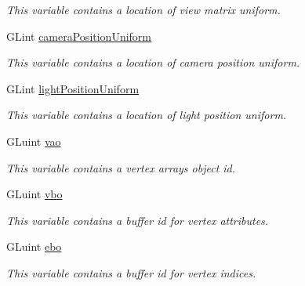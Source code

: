 \begin{DoxyCompactItemize}
\begin{DoxyCompactList}\small\item\em This variable contains a location of view matrix uniform. \end{DoxyCompactList}\item 
\hypertarget{structPhongVariables_a8ef62f404f03093b3e1da8f9d059646c}{G\-Lint \hyperlink{structPhongVariables_a8ef62f404f03093b3e1da8f9d059646c}{camera\-Position\-Uniform}}\label{structPhongVariables_a8ef62f404f03093b3e1da8f9d059646c}

\begin{DoxyCompactList}\small\item\em This variable contains a location of camera position uniform. \end{DoxyCompactList}\item 
\hypertarget{structPhongVariables_ac9e7ae0dd5a25a5b7b1cb8550f003c73}{G\-Lint \hyperlink{structPhongVariables_ac9e7ae0dd5a25a5b7b1cb8550f003c73}{light\-Position\-Uniform}}\label{structPhongVariables_ac9e7ae0dd5a25a5b7b1cb8550f003c73}

\begin{DoxyCompactList}\small\item\em This variable contains a location of light position uniform. \end{DoxyCompactList}\item 
\hypertarget{structPhongVariables_af01c9a1a6d56f621354a6d728cfe5731}{G\-Luint \hyperlink{structPhongVariables_af01c9a1a6d56f621354a6d728cfe5731}{vao}}\label{structPhongVariables_af01c9a1a6d56f621354a6d728cfe5731}

\begin{DoxyCompactList}\small\item\em This variable contains a vertex arrays object id. \end{DoxyCompactList}\item 
\hypertarget{structPhongVariables_a33b1bfb11c7032aafbb6fcc7d2589798}{G\-Luint \hyperlink{structPhongVariables_a33b1bfb11c7032aafbb6fcc7d2589798}{vbo}}\label{structPhongVariables_a33b1bfb11c7032aafbb6fcc7d2589798}

\begin{DoxyCompactList}\small\item\em This variable contains a buffer id for vertex attributes. \end{DoxyCompactList}\item 
\hypertarget{structPhongVariables_a9202c74c287b49b3b00ace28a8475fb4}{G\-Luint \hyperlink{structPhongVariables_a9202c74c287b49b3b00ace28a8475fb4}{ebo}}\label{structPhongVariables_a9202c74c287b49b3b00ace28a8475fb4}

\begin{DoxyCompactList}\small\item\em This variable contains a buffer id for vertex indices. \end{DoxyCompactList}\end{DoxyCompactItemize}


